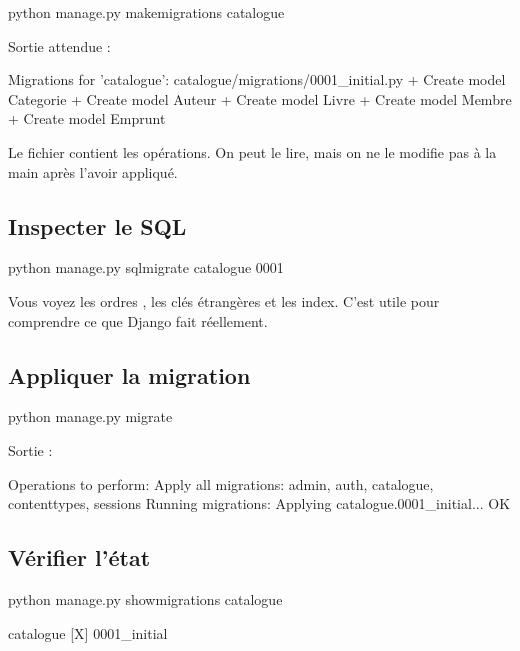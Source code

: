 \begin{terminal}
python manage.py makemigrations catalogue
\end{terminal}

Sortie attendue :

\begin{terminal}
Migrations for 'catalogue':
  catalogue/migrations/0001_initial.py
    + Create model Categorie
    + Create model Auteur
    + Create model Livre
    + Create model Membre
    + Create model Emprunt
\end{terminal}

Le fichier  contient les opérations. On peut le lire, mais
on ne le modifie pas à la main après l'avoir appliqué.

\subsection{Inspecter le SQL}

\begin{terminal}
python manage.py sqlmigrate catalogue 0001
\end{terminal}

Vous voyez les ordres , les clés étrangères et les index. C'est
utile pour comprendre ce que Django fait réellement.

\subsection{Appliquer la migration}

\begin{terminal}
python manage.py migrate
\end{terminal}

Sortie :

\begin{terminal}
Operations to perform:
  Apply all migrations: admin, auth, catalogue, contenttypes, sessions
Running migrations:
  Applying catalogue.0001_initial... OK
\end{terminal}

\subsection{Vérifier l'état}

\begin{terminal}
python manage.py showmigrations catalogue
\end{terminal}

\begin{terminal}
catalogue
 [X] 0001_initial
\end{terminal}

